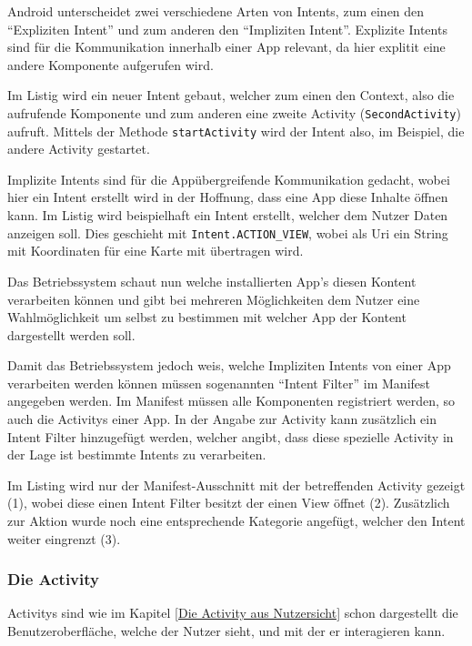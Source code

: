 Android unterscheidet zwei verschiedene Arten von Intents, zum einen den "`Expliziten Intent"' und zum anderen den "`Impliziten Intent"'. Explizite Intents sind f\"ur die Kommunikation innerhalb einer App relevant, da hier explitit eine andere Komponente aufgerufen wird. 

Im Listig wird ein neuer Intent gebaut, welcher zum einen den Context, also die aufrufende Komponente und zum anderen eine zweite Activity (\texttt{SecondActivity}) aufruft. Mittels der Methode \texttt{startActivity} wird der Intent also, im Beispiel, die andere Activity gestartet.



Implizite Intents sind f\"ur die App\"ubergreifende Kommunikation gedacht, wobei hier ein Intent erstellt wird in der Hoffnung, dass eine App diese Inhalte \"offnen kann.
Im Listig wird beispielhaft ein Intent erstellt, welcher dem Nutzer Daten anzeigen soll. Dies geschieht mit \texttt{Intent.ACTION\_VIEW}, wobei als Uri ein String mit Koordinaten f\"ur eine Karte mit \"ubertragen wird.



Das Betriebssystem schaut nun welche installierten App's diesen Kontent verarbeiten k\"onnen und gibt bei mehreren M\"oglichkeiten dem Nutzer eine Wahlm\"oglichkeit um selbst zu bestimmen mit welcher App der Kontent dargestellt werden soll.

Damit das Betriebssystem jedoch weis, welche Impliziten Intents von einer App verarbeiten werden k\"onnen m\"ussen sogenannten "`Intent Filter"' im Manifest angegeben werden.
Im Manifest m\"ussen alle Komponenten registriert werden, so auch die Activitys einer App. In der Angabe zur Activity kann zus\"atzlich ein Intent Filter hinzugef\"ugt werden, welcher angibt, dass diese spezielle Activity in der Lage ist bestimmte Intents zu verarbeiten.

Im Listing wird nur der Manifest-Ausschnitt mit der betreffenden Activity gezeigt (1), wobei diese einen Intent Filter besitzt der einen View \"offnet (2). Zus\"atzlich zur Aktion wurde noch eine entsprechende Kategorie angef\"ugt, welcher den Intent weiter eingrenzt (3). \cite{VogellaIntent}



\subsubsection{Die Activity} \label{Die Activity aus Programmierersicht}
Activitys sind wie im Kapitel \ref{Die Activity aus Nutzersicht} schon dargestellt die Benutzeroberfl\"ache, welche der Nutzer sieht, und mit der er interagieren kann.

